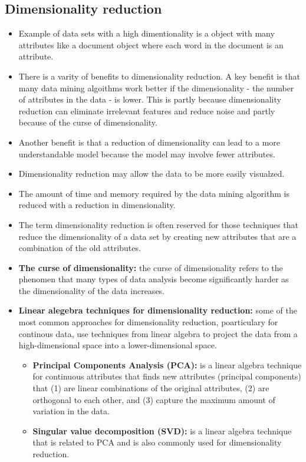 	\subsection{Dimensionality reduction}
		\begin{itemize}
			\item Example of data sets with a high dimentionality is a object with many
			attributes like a document object where each word in the document is an 
			attribute. 
			\item There is a varity of benefits to dimensionality reduction. A key benefit 
			is that many data mining algoithms work better if the dimensionality - 
			the number of attributes in the data - is lower. This is partly because 
			dimensionality reduction can eliminate irrelevant features and reduce noise and
			partly because of the curse of dimensionality.
			\item Another benefit is that a reduction of dimensionality can lead to a more
			understandable model because the model may involve fewer attributes.
			\item Dimensionality reduction may allow the data to be more easily visualzed.
			\item The amount of time and memory required by the data mining algorithm is reduced 
			with a reduction in dimensionality. 
			\item The term dimensionality reduction is often reserved for those techniques
			that reduce the dimensionality of a data set by creating new attributes that
			are a combination of the old attributes. 
			\item {\bf The curse of dimensionality:} the curse of dimensionality refers
			to the phenomen that many types of data analysis become significantly harder
			as the dimensionality of the data increases. 
			\item {\bf Linear alegebra techniques for dimensionality reduction:} some
			of the most common approaches for dimensionality reduction, poarticulary for
			continous data, use techniques from linear algebra to project the data from a 
			high-dimensional space into a lower-dimensional space. 
				\begin{itemize}
					\item {\bf Principal Components Analysis (PCA):} is a linear algebra technique 
					for continuous attributes that finds new attributes (principal components)
					that (1) are linear combinations of the original attributes, 
					(2) are orthogonal to each other, and (3) capture the maximum amount of 
					variation in the data. 
					\item {\bf Singular value decomposition (SVD): } is a linear algebra
					technique that is related to PCA and is also commonly used for
					dimensionality reduction.
				\end{itemize}
		\end{itemize}

